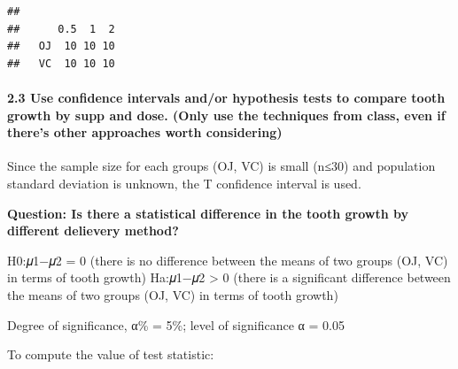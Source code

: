 \documentclass[
  landscape]{article}
\newenvironment{Shaded}{\begin{snugshade}}{\end{snugshade}}
\newcommand{\CommentTok}[1]{\textcolor[rgb]{0.56,0.35,0.01}{\textit{#1}}}
\newcommand{\DataTypeTok}[1]{\textcolor[rgb]{0.13,0.29,0.53}{#1}}
\newcommand{\KeywordTok}[1]{\textcolor[rgb]{0.13,0.29,0.53}{\textbf{#1}}}
\newcommand{\NormalTok}[1]{#1}
\newcommand{\OperatorTok}[1]{\textcolor[rgb]{0.81,0.36,0.00}{\textbf{#1}}}
\newcommand{\StringTok}[1]{\textcolor[rgb]{0.31,0.60,0.02}{#1}}
\begin{document}
\begin{Shaded}
\end{Shaded}

\begin{verbatim}
##     
##      0.5  1  2
##   OJ  10 10 10
##   VC  10 10 10
\end{verbatim}

\hypertarget{use-confidence-intervals-andor-hypothesis-tests-to-compare-tooth-growth-by-supp-and-dose.-only-use-the-techniques-from-class-even-if-theres-other-approaches-worth-considering}{%
\paragraph{2.3 Use confidence intervals and/or hypothesis tests to
compare tooth growth by supp and dose. (Only use the techniques from
class, even if there's other approaches worth
considering)}\label{use-confidence-intervals-andor-hypothesis-tests-to-compare-tooth-growth-by-supp-and-dose.-only-use-the-techniques-from-class-even-if-theres-other-approaches-worth-considering}}

Since the sample size for each groups (OJ, VC) is small (n≤30) and
population standard deviation is unknown, the T confidence interval is
used.

\textbf{Question: Is there a statistical difference in the tooth growth
by different delievery method?}

H0:𝜇1−𝜇2 = 0 (there is no difference between the means of two groups
(OJ, VC) in terms of tooth growth) Ha:𝜇1−𝜇2 \textgreater{} 0 (there is a
significant difference between the means of two groups (OJ, VC) in terms
of tooth growth)

Degree of significance, α\% = 5\%; level of significance α = 0.05

To compute the value of test statistic:
\end{document}
